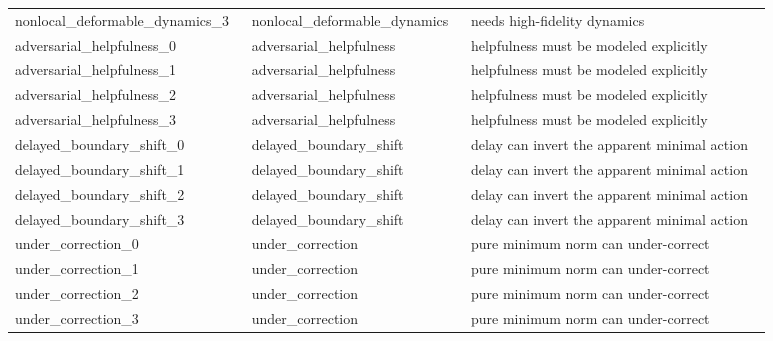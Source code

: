 \documentclass{article}
\begin{document}
\begin{center}
\begin{longtable}{p{0.25\linewidth}p{0.25\linewidth}p{0.38\linewidth}}
nonlocal\_deformable\_dynamics\_3 & nonlocal\_deformable\_dynamics & needs high-fidelity dynamics\\
adversarial\_helpfulness\_0 & adversarial\_helpfulness & helpfulness must be modeled explicitly\\
adversarial\_helpfulness\_1 & adversarial\_helpfulness & helpfulness must be modeled explicitly\\
adversarial\_helpfulness\_2 & adversarial\_helpfulness & helpfulness must be modeled explicitly\\
adversarial\_helpfulness\_3 & adversarial\_helpfulness & helpfulness must be modeled explicitly\\
delayed\_boundary\_shift\_0 & delayed\_boundary\_shift & delay can invert the apparent minimal action\\
delayed\_boundary\_shift\_1 & delayed\_boundary\_shift & delay can invert the apparent minimal action\\
delayed\_boundary\_shift\_2 & delayed\_boundary\_shift & delay can invert the apparent minimal action\\
delayed\_boundary\_shift\_3 & delayed\_boundary\_shift & delay can invert the apparent minimal action\\
under\_correction\_0 & under\_correction & pure minimum norm can under-correct\\
under\_correction\_1 & under\_correction & pure minimum norm can under-correct\\
under\_correction\_2 & under\_correction & pure minimum norm can under-correct\\
under\_correction\_3 & under\_correction & pure minimum norm can under-correct\\
\bottomrule
\end{longtable}
\normalsize
\end{center}
\end{document}

